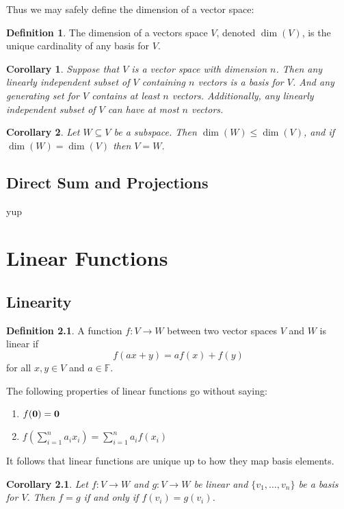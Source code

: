 \documentclass[oneside, 12pt]{book}
\newtheorem{cor}{Corollary}[section]
\theoremstyle{definition}
\newtheorem{defn}{Definition}[section]
\begin{document}
Thus we may safely define the dimension of a vector space:
\begin{defn}
  \label{defn_dim}
The dimension of a vectors space $V$, denoted $\dim(V)$, is the unique cardinality of any basis for $V$.
\end{defn}
\begin{cor}
\label{cor_base}
Suppose that $V$ is a vector space with dimension $n$. Then any linearly independent subset of $V$ containing $n$ vectors is a basis for $V$.
And any generating set for $V$ contains at least $n$ vectors.
Additionally, any linearly independent subset of $V$ can have at most $n$ vectors.
\end{cor}
\begin{cor}
  \label{cor_bassub}
Let $W\subseteq V$ be a subspace. Then $\dim(W)\leq \dim(V)$, and if $\dim(W)=\dim(V)$ then $V=W$.
\end{cor}
\section{Direct Sum and Projections}
yup
\chapter{Linear Functions}
\section{Linearity}
\begin{defn}
  \label{defn_lin}
  A function $f: V \to W$ between two vector spaces $V$ and $W$ is linear if
  \[f(ax+y)=af(x)+f(y)\] for all $x, y \in V$ and $a \in \mathbb{F}$.
\end{defn}
The following properties of linear functions go without saying:
\begin{enumerate}
  \item $f(\bold{0})=\bold{0}$
  \item $f(\sum_{i=1}^{n}a_{i}x_{i})=\sum_{i=1}^{n}a_{i}f(x_{i})$
\end{enumerate}
It follows that linear functions are unique up to how they map basis elements.
\begin{cor}
  \label{cor_linbas}
  Let $f:V \to W$ and $g: V \to W$ be linear and $\{v_{1}, \dots, v_{n}\}$ be a basis for $V$. Then $f=g$ if and only if $f(v_{i})=g(v_{i})$.
\end{cor}
\end{document}
